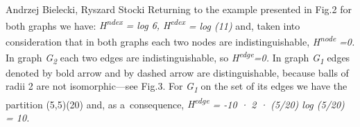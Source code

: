 \begin{artengenv2auth}{Andrzej Bielecki, Ryszard Stocki}
Returning to the example presented in Fig.2 for both graphs we have: \textit{H}\textit{\textsuperscript{ndex}} \textit{= log 6, H}\textit{\textsuperscript{edex}} \textit{= log (11)} and, taken into consideration that in both graphs each two nodes are indistinguishable, \textit{H}\textit{\textsuperscript{node}} \textit{=0.} In graph \textit{G}\textit{\textsubscript{2}} each two edges are indistinguishable, so \textit{H}\textit{\textsuperscript{edge}}\textit{=0.} In graph \textit{G}\textit{\textsubscript{1}} edges denoted by bold arrow and by dashed arrow are distinguishable, because balls of radii 2 are not isomorphic---see Fig.3. For \textit{G}\textit{\textsubscript{1}} on the set of its edges we have the partition (5,5)(20) and, as a~consequence, \textit{H}\textit{\textsuperscript{edge}} \textit{= -10 · 2 · (5/20) log (5/20) = 10.} 
	

\begin{figure}[htbp]
 \centering %


\end{figure}
\end{artengenv2auth}
